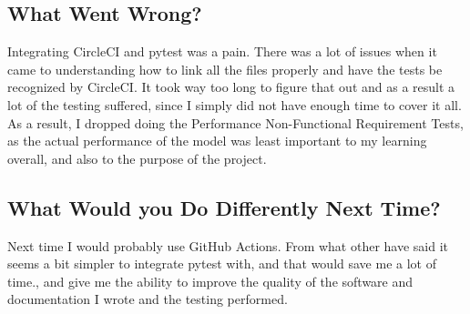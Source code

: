 \documentclass{article}
\begin{document}
\subsection{What Went Wrong?}

Integrating CircleCI and pytest was a pain. There was a lot of issues when it came to understanding how to link all the files properly and
have the tests be recognized by CircleCI. It took way too long to figure that out and as a result a lot of the testing suffered, since I simply
did not have enough time to cover it all. As a result, I dropped doing the Performance Non-Functional Requirement Tests, as the actual
performance of the model was least important to my learning overall, and also to the purpose of the project.

\subsection{What Would you Do Differently Next Time?}

Next time I would probably use GitHub Actions. From what other have said it seems a bit simpler to integrate pytest with, and that would save me a 
lot of time., and give me the ability to improve the quality of the software and documentation I wrote and the testing performed.
\end{document}
